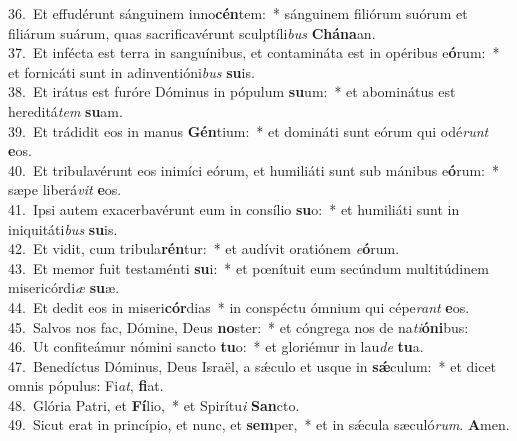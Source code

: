 {36.~}Et effudérunt sánguinem inno\textbf{cén}tem:~* sánguinem filiórum suórum et filiárum suárum, quas sacrificavérunt sculptíli\textit{bus} \textbf{Chá}\textbf{na}an.\\
{37.~}Et infécta est terra in sanguínibus, et contamináta est in opéribus e\textbf{ó}rum:~* et fornicáti sunt in adinventióni\textit{bus} \textbf{su}is.\\
{38.~}Et irátus est furóre Dóminus in pópulum \textbf{su}um:~* et abominátus est hereditá\textit{tem} \textbf{su}am.\\
{39.~}Et trádidit eos in manus \textbf{Gén}tium:~* et domináti sunt eórum qui odé\textit{runt} \textbf{e}os.\\
{40.~}Et tribulavérunt eos inimíci eórum, et humiliáti sunt sub mánibus e\textbf{ó}rum:~* sæpe liberá\textit{vit} \textbf{e}os.\\
{41.~}Ipsi autem exacerbavérunt eum in consílio \textbf{su}o:~* et humiliáti sunt in iniquitáti\textit{bus} \textbf{su}is.\\
{42.~}Et vidit, cum tribula\textbf{rén}tur:~* et audívit oratiónem \textit{e}\textbf{ó}rum.\\
{43.~}Et memor fuit testaménti \textbf{su}i:~* et pœnítuit eum secúndum multitúdinem misericórdi\textit{æ} \textbf{su}æ.\\
{44.~}Et dedit eos in miseri\textbf{cór}dias~* in conspéctu ómnium qui cépe\textit{rant} \textbf{e}os.\\
{45.~}Salvos nos fac, Dómine, Deus \textbf{no}ster:~* et cóngrega nos de na\textit{ti}\textbf{ó}\textbf{ni}bus:\\
{46.~}Ut confiteámur nómini sancto \textbf{tu}o:~* et gloriémur in lau\textit{de} \textbf{tu}a.\\
{47.~}Benedíctus Dóminus, Deus Israël, a sǽculo et usque in \textbf{sǽ}culum:~* et dicet omnis pópulus: Fi\textit{at}, \textbf{fi}at.\\
{48.~}Glória Patri, et \textbf{Fí}lio,~* et Spirítu\textit{i} \textbf{San}cto.\\
{49.~}Sicut erat in princípio, et nunc, et \textbf{sem}per,~* et in sǽcula sæculó\textit{rum}. \textbf{A}men.\\
